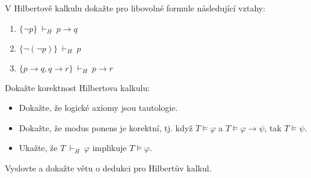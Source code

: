 \documentclass[a4paper,12pt]{article}
\begin{document}
    
    \medskip\begin{problem}
    V Hilbertově kalkulu dokažte pro libovolné formule následující vztahy:
    \begin{enumerate}
        \item $\{\neg p\}\ \vdash_H\ p\to q$
        \item $\{\neg(\neg p)\}\ \vdash_H\ p$
        \item $\{p\to q,q \to r\}\ \vdash_H\ p\to r$
    \end{enumerate}    
    \end{problem}
    
    \medskip\begin{problem}
        Dokažte korektnost Hilbertova kalkulu:
        \begin{itemize}
            \item Dokažte, že logické axiomy jsou tautologie.
            \item Dokažte, že modus ponens je korektní, tj. když $T\models\varphi$ a $T\models\varphi\to\psi$, tak $T\models\psi$.
            \item Ukažte, že $T\ \vdash_H\ \varphi$ implikuje $T\models\varphi$.
        \end{itemize}
        \end{problem}
        
    \medskip\begin{problem}
        Vyslovte a dokažte větu o dedukci pro Hilbertův kalkul.
    \end{problem}
       
\end{document}
